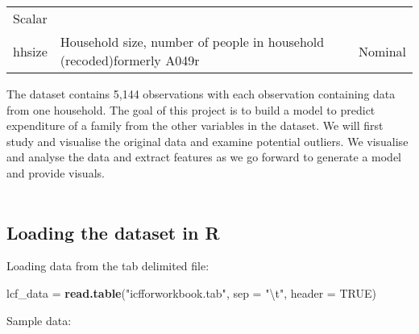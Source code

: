 \documentclass[]{article}
\newenvironment{Shaded}{\begin{snugshade}}{\end{snugshade}}
\newcommand{\CharTok}[1]{\textcolor[rgb]{0.31,0.60,0.02}{#1}}
\newcommand{\DataTypeTok}[1]{\textcolor[rgb]{0.13,0.29,0.53}{#1}}
\newcommand{\KeywordTok}[1]{\textcolor[rgb]{0.13,0.29,0.53}{\textbf{#1}}}
\newcommand{\NormalTok}[1]{#1}
\newcommand{\OperatorTok}[1]{\textcolor[rgb]{0.81,0.36,0.00}{\textbf{#1}}}
\newcommand{\OtherTok}[1]{\textcolor[rgb]{0.56,0.35,0.01}{#1}}
\newcommand{\StringTok}[1]{\textcolor[rgb]{0.31,0.60,0.02}{#1}}
\begin{document}
\begin{longtable}[]{@{}lll@{}}
\begin{minipage}[t]{0.14\columnwidth}
Scalar\strut
\end{minipage}\tabularnewline
\begin{minipage}[t]{0.14\columnwidth}\raggedright
hhsize\strut
\end{minipage} & \begin{minipage}[t]{0.64\columnwidth}\raggedright
Household size, number of people in household (recoded)formerly
A049r\strut
\end{minipage} & \begin{minipage}[t]{0.14\columnwidth}\raggedright
Nominal\strut
\end{minipage}\tabularnewline
\bottomrule
\end{longtable}

The dataset contains 5,144 observations with each observation containing
data from one household. The goal of this project is to build a model to
predict expenditure of a family from the other variables in the dataset.
We will first study and visualise the original data and examine
potential outliers. We visualise and analyse the data and extract
features as we go forward to generate a model and provide visuals.\\
~\\

\hypertarget{loading-the-dataset-in-r}{%
\subsection{Loading the dataset in R}\label{loading-the-dataset-in-r}}

Loading data from the tab delimited file:

\begin{Shaded}
\begin{Highlighting}[]
\NormalTok{lcf_data =}\StringTok{ }\KeywordTok{read.table}\NormalTok{(}\StringTok{"icfforworkbook.tab"}\NormalTok{, }\DataTypeTok{sep =} \StringTok{"}\CharTok{\textbackslash{}t}\StringTok{"}\NormalTok{, }\DataTypeTok{header =} \OtherTok{TRUE}\NormalTok{)}
\end{Highlighting}
\end{Shaded}

Sample data:

\begin{Shaded}
\end{Shaded}
\end{document}
